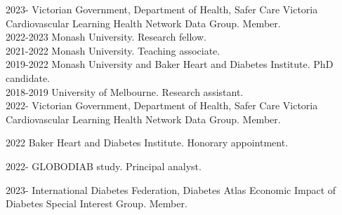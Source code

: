 \documentclass[11pt]{article}
\begin{document}
2023- \hspace*{0.5cm} Victorian Government, Department of Health, 
Safer Care Victoria Cardiovascular Learning Health Network Data Group. Member. \\
2022-\color{white}2023 \color{black} \hspace*{0.5cm} Monash University. Research fellow. \\
2021-2022 \hspace*{0.5cm} Monash University. Teaching associate. \\
2019-2022 \hspace*{0.5cm} Monash University and Baker Heart and Diabetes Institute. PhD candidate. \\
2018-2019 \hspace*{0.5cm} University of Melbourne. Research assistant. \\


2022-	Victorian Government, Department of Health, Safer Care Victoria Cardiovascular Learning Health Network Data Group. Member. 

2022	Baker Heart and Diabetes Institute. Honorary appointment.  

2022-	GLOBODIAB study. Principal analyst. 

2023-	International Diabetes Federation, Diabetes Atlas Economic Impact of Diabetes Special Interest Group. Member. 

\color{white}
\cite{MortonDLOGIA2023}
\color{black}

\clearpage

\end{document}
